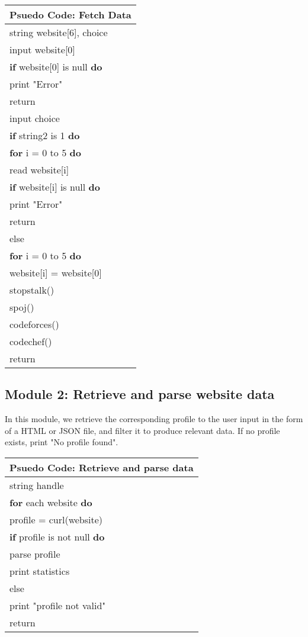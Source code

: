 \documentclass[12pt,a4paper]{report}
\newcommand\tab{\hspace{8mm}}
\newenvironment{rcenter}
 {\setlength{\topsep}{1em}\center}
{\endcenter}
\begin{document}
\begin{rcenter}
\begin{tabularx}{\textwidth}{ | X | } 
\hline
\textbf{Psuedo Code:} Fetch Data \\ 
\hline
string website{[6]}, choice \\
input website{[0]} \\

\tab \textbf{if} website[0] is null \textbf{do} \\
\tab\tab print "Error" \\
\tab\tab	return \\

input choice\\
\tab \textbf{if} string2 is 1 \textbf{do} \\
\tab\tab		\textbf{for} i = 0 to 5 \textbf{do} \\
\tab\tab		read website[i] \\
\tab\tab		\textbf{if} website[i] is null \textbf{do} \\
\tab\tab\tab		print "Error" \\
\tab\tab\tab		return \\
\tab\tab	else \\
\tab\tab\tab	\textbf{for} i = 0 to 5 \textbf{do} \\
\tab\tab\tab website[i] = website[0] \\

stopstalk() \\
spoj() \\
codeforces() \\
codechef() \\
return \\
\hline
\end{tabularx}
\end{rcenter}

\newpage
\subsection{Module 2: Retrieve and parse website data}
In this module, we retrieve the corresponding profile to the user input in the form of a HTML or JSON file, and filter it to produce relevant data. If no profile exists, print "No profile found".

\begin{rcenter}
\begin{tabularx}{\textwidth}{ | X | } 
\hline
\textbf{Psuedo Code:} Retrieve and parse data\\ 
\hline
string handle \\
\tab \textbf{for} each website \textbf{do} \\
\tab profile = curl(website) \\
\tab\tab \textbf{if} profile is not null \textbf{do} \\
\tab\tab\tab parse profile \\
\tab\tab\tab print statistics \\
\tab\tab else \\
\tab\tab\tab print "profile not valid" \\
return \\
\hline
\end{tabularx}
\end{rcenter}
\end{document}
